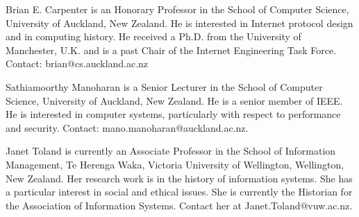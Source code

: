 \documentclass{IEEEcsmag}
\begin{document}
\begin{IEEEbiography}{Brian E. Carpenter} is an Honorary Professor in the School of Computer Science, University of Auckland, New Zealand. He is interested in Internet protocol design and in computing history. He received a Ph.D. from the University of Manchester, U.K. and is a past Chair of the Internet Engineering Task Force. Contact: brian@cs.auckland.ac.nz\vspace*{8pt}
\end{IEEEbiography}

\begin{IEEEbiography}{Sathiamoorthy Manoharan} is a Senior Lecturer in the School of Computer Science, University of Auckland, New Zealand.
He is a senior member of IEEE. He is interested in computer systems, particularly with respect to performance and security. Contact: mano.manoharan@auckland.ac.nz.\vspace*{8pt}
\end{IEEEbiography}

\begin{IEEEbiography}{Janet Toland} is currently an Associate Professor in the
School of Information Management, Te Herenga Waka, Victoria
University of Wellington, Wellington, New Zealand. Her
research work is in the history of information systems. She
has a particular interest in social and ethical issues. She is
currently the Historian for the Association of Information
Systems. Contact her at Janet.Toland@vuw.ac.nz.\vspace*{8pt}
\end{IEEEbiography}
\end{document}
